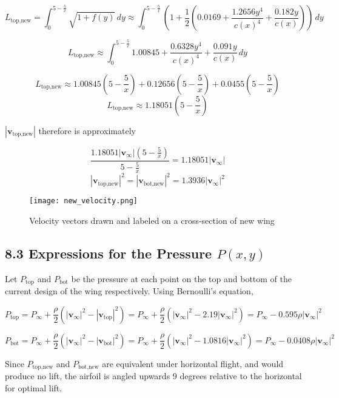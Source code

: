 \documentclass[12pt]{article}
\begin{document}
\[
 L_{\text{top,new}} = \int_0^{5 - \frac{5}{x}} \sqrt{1 + f(y)} \, dy \approx \int_0^{5 - \frac{5}{x}} \left(1 + \frac{1}{2}\left(0.0169 + \frac{1.2656 y^4}{c(x)^4} + \frac{0.182 y}{c(x)} \right)\right) \, dy
\]



\[ L_{\text{top,new}} \approx \int_0^{5 - \frac{5}{x}} 1.00845 + \frac{0.6328y^4}{c(x)^4} + \frac{0.091y}{c(x)}  \, dy \]



\[
L_{\text{top,new}} \approx 1.00845 \left(5 - \frac{5}{x}\right) + 0.12656\left( 5 - \frac{5}{x}\right) + 0.0455\left( 5 - \frac{5}{x}\right) 
\]
\[ L_{\text{top,new}} \approx 1.18051\left( 5 - \frac{5}{x}\right)\]

$|\mathbf{v}_{\text{top,new}}|$ therefore is approximately

\[ \frac{1.18051|\mathbf{v}_{\infty}|\left( 5 - \frac{5}{x}\right)}{5 - \frac{5}{x}} = 1.18051|\mathbf{v}_{\infty}| \]
\[|\mathbf{v}_{\text{top,new}}|^2 = |\mathbf{v}_{\text{bot,new}}|^2 = 1.3936|\mathbf{v}_{\infty}|^2 \]

\begin{figure}[H]
    \centering
    \texttt{[image: new\_velocity.png]}
    \caption{Velocity vectors drawn and labeled on a cross-section of new wing}
\end{figure}

\subsection*{8.3 Expressions for the Pressure $P(x, y)$}
Let $ P_{\text{top}}$ and $P_{\text{bot}}$ be the pressure at each point on the top and bottom of the current design of the wing respectively. Using Bernoulli's equation, 

\[P_{\text{top}} = P_{\infty} + \frac{\rho}{2}(|\mathbf{v}_{\infty}|^2 - |\mathbf{v}_{\text{top}}|^2) = P_{\infty} + \frac{\rho}{2}\left(|\mathbf{v}_{\infty}|^2 - 2.19|\mathbf{v}_{\infty}|^2\right) = P_{\infty} - 0.595\rho |\mathbf{v}_{\infty}|^2 \]


\[P_{\text{bot}} = P_{\infty} + \frac{\rho}{2}(|\mathbf{v}_{\infty}|^2 - |\mathbf{v}_{\text{bot}}|^2) = P_{\infty} + \frac{\rho}{2}\left(|\mathbf{v}_{\infty}|^2 - 1.0816|\mathbf{v}_{\infty}|^2\right) = P_{\infty} - 0.0408 \rho |\mathbf{v}_{\infty}|^2 \]

Since $ P_{\text{top,new}}$ and $P_{\text{bot,new}}$ are equivalent under horizontal flight, and would produce no lift, the airfoil is angled upwards 9 degrees \cite{angle} relative to the horizontal for optimal lift. 
\end{document}
